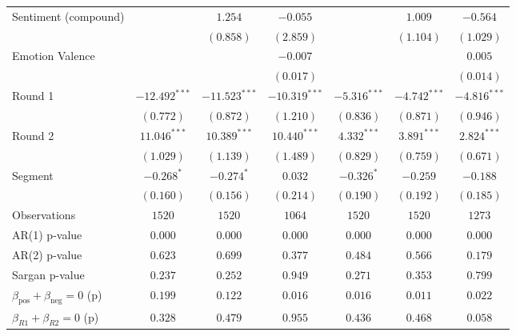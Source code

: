 \begin{adjustbox}{max width=\textwidth}
\begin{tabular}{l c c c c c c}
Sentiment (compound)                              &                 & $1.254$         & $-0.055$        &                & $1.009$        & $-0.564$       \\
                                                  &                 & $(0.858)$       & $(2.859)$       &                & $(1.104)$      & $(1.029)$      \\
Emotion Valence                                   &                 &                 & $-0.007$        &                &                & $0.005$        \\
                                                  &                 &                 & $(0.017)$       &                &                & $(0.014)$      \\
Round 1                                           & $-12.492^{***}$ & $-11.523^{***}$ & $-10.319^{***}$ & $-5.316^{***}$ & $-4.742^{***}$ & $-4.816^{***}$ \\
                                                  & $(0.772)$       & $(0.872)$       & $(1.210)$       & $(0.836)$      & $(0.871)$      & $(0.946)$      \\
Round 2                                           & $11.046^{***}$  & $10.389^{***}$  & $10.440^{***}$  & $4.332^{***}$  & $3.891^{***}$  & $2.824^{***}$  \\
                                                  & $(1.029)$       & $(1.139)$       & $(1.489)$       & $(0.829)$      & $(0.759)$      & $(0.671)$      \\
Segment                                           & $-0.268^{*}$    & $-0.274^{*}$    & $0.032$         & $-0.326^{*}$   & $-0.259$       & $-0.188$       \\
                                                  & $(0.160)$       & $(0.156)$       & $(0.214)$       & $(0.190)$      & $(0.192)$      & $(0.185)$      \\
\midrule
Observations                                      & $1520$          & $1520$          & $1064$          & $1520$         & $1520$         & $1273$         \\
AR(1) p-value                                     & $0.000$         & $0.000$         & $0.000$         & $0.000$        & $0.000$        & $0.000$        \\
AR(2) p-value                                     & $0.623$         & $0.699$         & $0.377$         & $0.484$        & $0.566$        & $0.179$        \\
Sargan p-value                                    & $0.237$         & $0.252$         & $0.949$         & $0.271$        & $0.353$        & $0.799$        \\
$\beta_{\text{pos}} + \beta_{\text{neg}} = 0$ (p) & $0.199$         & $0.122$         & $0.016$         & $0.016$        & $0.011$        & $0.022$        \\
$\beta_{R1} + \beta_{R2} = 0$ (p)                 & $0.328$         & $0.479$         & $0.955$         & $0.436$        & $0.468$        & $0.058$        \\
\bottomrule
\end{tabular}
\end{adjustbox}
